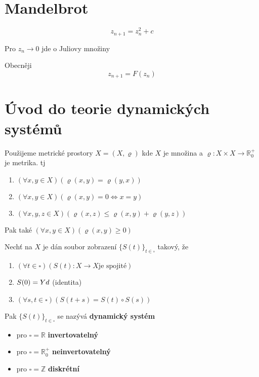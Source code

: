 \documentclass[../main.tex]{subfiles}
\begin{document}
\section{Mandelbrot}

\begin{equation}
    z_{n+1} = z_n^2 + c
\end{equation}

Pro $z_n \to 0$ jde o Juliovy množiny

Obecněji 
\begin{equation}
    z_{n+1} = F(z_n)
\end{equation}






\section{Úvod do teorie dynamických systémů}

\begin{remark}
    Použijeme metrické prostory $X = (X, \varrho)$ kde $X$ je 
    množina a $\varrho: X \times X \to \mathbb{R}^+_0$
    je metrika. tj
    \begin{enumerate}
        \item $(\forall x,y \in X )(\varrho(x,y) = \varrho(y,x))$
        \item $(\forall x,y \in X )(\varrho(x,y) = 0 \Leftrightarrow x =y)$
        \item $(\forall x,y,z \in X) (\varrho(x,z) \leq \varrho(x,y) + \varrho(y,z))$
    \end{enumerate}
    Pak také $(\forall x,y \in X) (\varrho(x,y) \geq 0)$
\end{remark}

\begin{definition}
    Nechť na $X$ je dán soubor zobrazení $\{S(t)\}_{t\in \square}$ takový, že 
    \begin{enumerate}
        \item $(\forall t \in \square)(S(t): X \to X \text{je spojité})$
        \item $S(0) = Yd$ (identita)
        \item $(\forall s,t \in \square)(S (t+s) = S(t) \circ S(s))$
    \end{enumerate}

    Pak $\{S(t)\}_{t\in\square}$ se nazývá \textbf{dynamický systém} 
    \begin{itemize}
        \item pro $\square = \mathbb{R}$ \textbf{invertovatelný}
        \item pro $\square = \mathbb{R}_0^+$ \textbf{neinvertovatelný}
        \item pro $\square = \mathbb{Z}$ \textbf{diskrétní}
    \end{itemize}
\end{definition}
\end{document}
